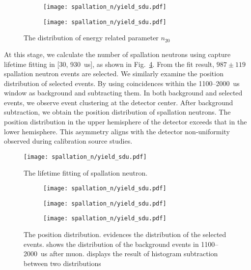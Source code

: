 \begin{figure}[h]
	\centering
	\begin{subfigure}{0.5\textwidth}
		\centering
		\texttt{[image: spallation\_n/yield\_sdu.pdf]}
		\caption{}
		\label{fig:coinESPN0}
	\end{subfigure}%
	\begin{subfigure}{0.5\textwidth}
		\centering
		\texttt{[image: spallation\_n/yield\_sdu.pdf]}
		\caption{}
		\label{fig:coinESPN1}
	\end{subfigure}
	\caption{The distribution of energy related parameter $n_{20}$}
	\label{fig:coinESPN}
\end{figure}

At this stage, we calculate the number of spallation neutrons using capture lifetime fitting in [30, \SI{930}{us}], as shown in Fig.~\ref{fig:lifeSPNSDU}. From the fit result, $987\pm 119$ spallation neutron events are selected. We similarly examine the position distribution of selected events. By using coincidences within the 1100--\SI{2000}{us} window as background and subtracting them. In both background and selected events, we observe event clustering at the detector center. After background subtraction, we obtain the position distribution of spallation neutrons. The position distribution in the upper hemisphere of the detector exceeds that in the lower hemisphere. This asymmetry aligns with the detector non-uniformity observed during calibration source studies.
\begin{figure}[h]
	\centering
	\texttt{[image: spallation\_n/yield\_sdu.pdf]}
	\caption{The lifetime fitting of spallation neutron.}
	\label{fig:lifeSPNSDU}
\end{figure}

\begin{figure}[h]
	\centering
	\begin{subfigure}{0.5\textwidth}
		\centering
		\texttt{[image: spallation\_n/yield\_sdu.pdf]}
		\caption{}
		\label{fig:coinPOS_sig}
	\end{subfigure}%
	\begin{subfigure}{0.5\textwidth}
		\centering
		\texttt{[image: spallation\_n/yield\_sdu.pdf]}
		\caption{}
		\label{fig:coinPOS_bkg}
	\end{subfigure}
	\begin{subfigure}{0.5\textwidth}
		\centering
		\texttt{[image: spallation\_n/yield\_sdu.pdf]}
		\caption{}
		\label{fig:coinPOS_ex}
	\end{subfigure}
	\caption{The position distribution.  evidences the distribution of the selected events.  shows the distribution of the background events in 1100--\SI{2000}{us} after muon.  displays the result of histogram subtraction between two distributions}
	\label{fig:coinPOS}
\end{figure}

